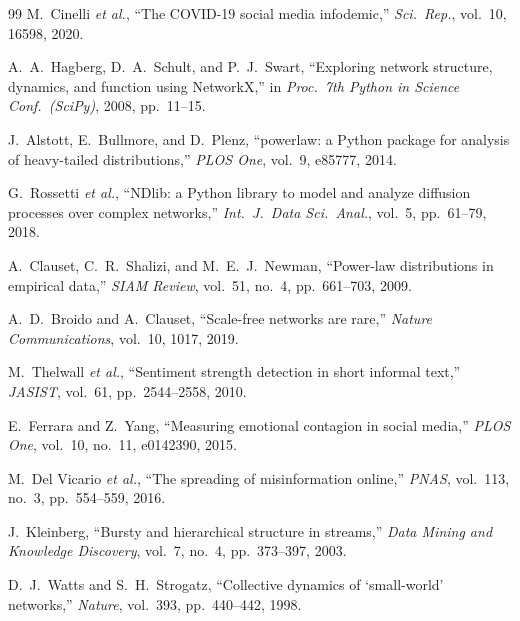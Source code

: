 \documentclass[conference]{IEEEtran}
\begin{document}
\begin{thebibliography}{99}
M.~Cinelli \emph{et al.},
``The COVID-19 social media infodemic,''
\emph{Sci.\ Rep.}, vol.~10, 16598, 2020.

A.~A.~Hagberg, D.~A.~Schult, and P.~J.~Swart,
``Exploring network structure, dynamics, and function using
  NetworkX,''
in \emph{Proc.\ 7th Python in Science Conf.\ (SciPy)}, 2008,
pp.~11--15.

J.~Alstott, E.~Bullmore, and D.~Plenz,
``powerlaw: a Python package for analysis of heavy-tailed
  distributions,''
\emph{PLOS One}, vol.~9, e85777, 2014.

G.~Rossetti \emph{et al.},
``NDlib: a Python library to model and analyze diffusion
  processes over complex networks,''
\emph{Int.\ J.\ Data Sci.\ Anal.}, vol.~5, pp.~61--79, 2018.

A.~Clauset, C.~R.~Shalizi, and M.~E.~J.~Newman,
``Power-law distributions in empirical data,''
\emph{SIAM Review}, vol.~51, no.~4, pp.~661--703, 2009.

A.~D.~Broido and A.~Clauset,
``Scale-free networks are rare,''
\emph{Nature Communications}, vol.~10, 1017, 2019.

M.~Thelwall \emph{et al.},
``Sentiment strength detection in short informal text,''
\emph{JASIST}, vol.~61, pp.~2544--2558, 2010.

E.~Ferrara and Z.~Yang,
``Measuring emotional contagion in social media,''
\emph{PLOS One}, vol.~10, no.~11, e0142390, 2015.

M.~Del Vicario \emph{et al.},
``The spreading of misinformation online,''
\emph{PNAS}, vol.~113, no.~3, pp.~554--559, 2016.

J.~Kleinberg,
``Bursty and hierarchical structure in streams,''
\emph{Data Mining and Knowledge Discovery}, vol.~7, no.~4,
pp.~373--397, 2003.

D.~J.~Watts and S.~H.~Strogatz,
``Collective dynamics of `small-world' networks,''
\emph{Nature}, vol.~393, pp.~440--442, 1998.

\end{thebibliography}

\appendix
\end{document}
